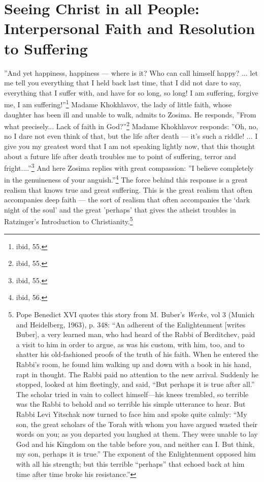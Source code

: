 \section{Seeing Christ in all People: Interpersonal Faith and Resolution to Suffering}

''And yet happiness, happiness --- where is it? Who can call himself happy? ... let me tell you everything that I held back last time, that I did not dare to say, everything that I suffer with, and have for so long, so long! I am suffering, forgive me, I am suffering!''\footnote{ibid, 55.} Madame Khokhlavov, the lady of little faith, whose daughter has been ill and unable to walk, admits to Zosima. He responds, ''From what precisely... Lack of faith in God?''\footnote{ibid, 55.} Madame Khokhlavov responds: ''Oh, no, no I dare not even think of that, but the life after death --- it's such a riddle! ... I give you my greatest word that I am not speaking lightly now, that this thought about a future life after death troubles me to point of suffering, terror and fright....''\footnote{ibid, 55.} And here Zosima replies with great compassion: ''I believe completely in the genuineness of your anguish.''\footnote{ibid, 56.} The force behind this response is a great realism that knows true and great suffering. This is the great realism that often accompanies deep faith --- the sort of realism that often accompanies the `dark night of the soul' and the great 'perhaps' that gives the atheist troubles in Ratzinger's Introduction to Christianity.\footnote{Pope Benedict XVI quotes this story from M. Buber's \emph{Werke}, vol 3 (Munich and Heidelberg, 1963), p. 348: ``An adherent of the Enlightenment [writes Buber], a very learned man, who had heard of the Rabbi of Berditchev, paid a visit to him in order to argue, as was his custom, with him, too, and to shatter his old-fashioned proofs of the truth of his faith. When he entered the Rabbi's room, he found him walking up and down with a book in his hand, rapt in thought. The Rabbi paid no attention to the new arrival. Suddenly he stopped, looked at him fleetingly, and said, ``But perhaps it is true after all.'' The scholar tried in vain to collect himself---his knees trembled, so terrible was the Rabbi to behold and so terrible his simple utterance to hear. But Rabbi Levi Yitschak now turned to face him and spoke quite calmly: ``My son, the great scholars of the Torah with whom you have argued wasted their words on you; as you departed you laughed at them. They were unable to lay God and his Kingdom on the table before you, and neither can I. But think, my son, perhaps it is true.'' The exponent of the Enlightenment opposed him with all his strength; but this terrible ``perhaps'' that echoed back at him time after time broke his resistance.''}

